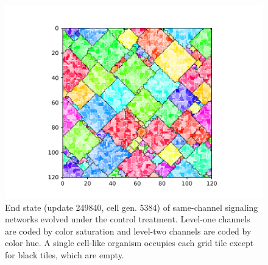 \begin{figure}%
\begin{center}

\includegraphics[width=\columnwidth,trim={2.5cm 0.5cm 2.5cm 1cm},clip]{img/ChannelMap_1018_update249840}

\caption{
End state (update 249840, cell gen. 5384) of same-channel signaling networks evolved under the control treatment.
Level-one channels are coded by color saturation and level-two channels are coded by color hue.
A single cell-like organism occupies each grid tile except for black tiles, which are empty.
}
\label{fig:outcome_control}
\end{center}
\end{figure}
